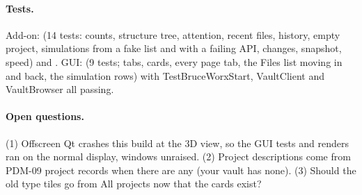 \paragraph{Tests.} Add-on:  (14 tests: counts, structure tree, attention, recent files,
history, empty project, simulations from a fake list and with a failing API, changes, snapshot, speed) and
. GUI:  (9 tests; tabs, cards, every page tab, the Files
list moving in and back, the simulation rows) with TestBruceWorxStart, VaultClient and VaultBrowser all passing.

\paragraph{Open questions.} (1) Offscreen Qt crashes this build at the 3D view, so the GUI tests and renders ran on the
normal display, windows unraised. (2) Project descriptions come from PDM-09 project records when there are any
(your vault has none). (3) Should the old type tiles go from All projects now that the cards exist?
